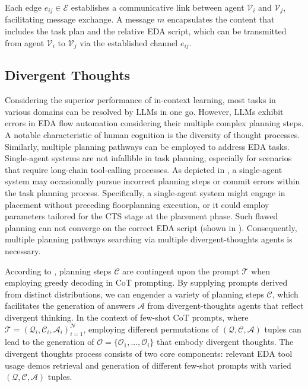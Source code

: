 Each edge $e_{ij} \in \mathcal{E}$ establishes a communicative link between agent $\mathcal{V}_{i}$ and $\mathcal{V}_{j}$, facilitating message exchange. 
A message $m$ encapsulates the content that includes the task plan and the relative EDA script, which can be transmitted from agent $\mathcal{V}_{i}$ to $\mathcal{V}_{j}$ via the established channel $e_{ij}$. 


\subsection{Divergent Thoughts}
Considering the superior performance of in-context learning, most tasks in various domains can be resolved by LLMs in one go. 
However, LLMs exhibit errors in EDA flow automation considering their multiple complex planning steps.
A notable characteristic of human cognition is the diversity of thought processes. 
Similarly, multiple planning pathways can be employed to address EDA tasks. 
Single-agent systems are not infallible in task planning, especially for scenarios that require long-chain tool-calling processes.
As depicted in , a single-agent system may occasionally pursue incorrect planning steps or commit errors within the task planning process. 
Specifically, a single-agent system might engage in placement without preceding floorplanning execution, or it could employ parameters tailored for the CTS stage at the placement phase.
Such flawed planning can not converge on the correct EDA script (shown in ). 
Consequently, multiple planning pathways searching via multiple divergent-thoughts agents is necessary.

According to , planning steps $\mathcal{C}$ are contingent upon the prompt $\mathcal{T}$ when employing greedy decoding in CoT prompting. 
By supplying prompts derived from distinct distributions, we can engender a variety of planning steps $\mathcal{C}$, which facilitates the generation of answers $\mathcal{A}$ from divergent-thoughts agents that reflect divergent thinking.
In the context of few-shot CoT prompts, where $\mathcal{T} = {(\mathcal{Q}_{i}, \mathcal{C}_{i}, \mathcal{A}_{i})}^{\mathcal{N}}_{i=1}$, employing different permutations of $(\mathcal{Q}, \mathcal{C}, \mathcal{A})$ tuples can lead to the generation of $\mathcal{O} = \{\mathcal{O}_{1}, ..., \mathcal{O}_{i}\}$ that embody divergent thoughts.
The divergent thoughts process consists of two core components: relevant EDA tool usage demos retrieval and generation of different few-shot prompts with varied $(\mathcal{Q}, \mathcal{C}, \mathcal{A})$ tuples.

